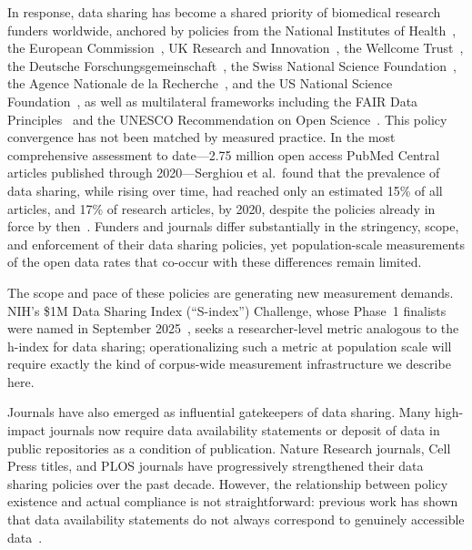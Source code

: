 In response, data sharing has become a shared priority of biomedical research funders worldwide, anchored by policies from the National Institutes of Health~\cite{NIH2020dms}, the European Commission~\cite{European-Commission2021-fu}, UK Research and Innovation~\cite{UK-Research-and-Innovation2016-gm}, the Wellcome Trust~\cite{Wellcome-Trust2017-rs}, the Deutsche Forschungsgemeinschaft~\cite{Deutsche-Forschungsgemeinschaft2019-ef}, the Swiss National Science Foundation~\cite{Swiss-National-Science-Foundation2017-el}, the Agence Nationale de la Recherche~\cite{Agence-Nationale-de-la-Recherche2019-mo}, and the US National Science Foundation~\cite{National-Science-Foundation2023-ij}, as well as multilateral frameworks including the FAIR Data Principles~\cite{Wilkinson2016-ap} and the UNESCO Recommendation on Open Science~\cite{UNESCO2021-vq}. This policy convergence has not been matched by measured practice. In the most comprehensive assessment to date---2.75 million open access PubMed Central articles published through 2020---Serghiou et al.\ found that the prevalence of data sharing, while rising over time, had reached only an estimated 15\% of all articles, and 17\% of research articles, by 2020, despite the policies already in force by then~\cite{Serghiou2021-pl}. Funders and journals differ substantially in the stringency, scope, and enforcement of their data sharing policies, yet population-scale measurements of the open data rates that co-occur with these differences remain limited.

The scope and pace of these policies are generating new measurement demands. NIH's \$1M Data Sharing Index (``S-index'') Challenge, whose Phase~1 finalists were named in September 2025~\cite{NEI2025sindex,Frank2024-dm}, seeks a researcher-level metric analogous to the h-index for data sharing; operationalizing such a metric at population scale will require exactly the kind of corpus-wide measurement infrastructure we describe here.

Journals have also emerged as influential gatekeepers of data sharing. Many high-impact journals now require data availability statements or deposit of data in public repositories as a condition of publication. Nature Research journals, Cell Press titles, and PLOS journals have progressively strengthened their data sharing policies over the past decade. However, the relationship between policy existence and actual compliance is not straightforward: previous work has shown that data availability statements do not always correspond to genuinely accessible data~\cite{Bobrov2024-jp}.

